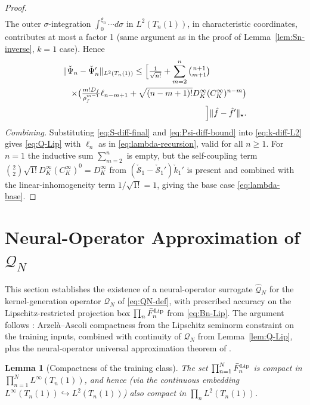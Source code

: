 \documentclass[journal,twoside,web]{ieeecolor}
\newtheorem{lemma}{Lemma}
\begin{document}
\begin{proof}
\begin{eqnarray}
\end{eqnarray}
The outer $\sigma$-integration $\int_0^{\xi_n}\cdots d\sigma$ in $L^2(T_n(1))$, in characteristic coordinates, contributes at most a factor 1 (same argument as in the proof of Lemma~\ref{lem:Sn-inverse}, $k=1$ case). Hence
\begin{eqnarray}
\lefteqn{\|\check\Psi_n-\check\Psi_n'\|_{L^2(T_n(1))}\le\Big[\tfrac{1}{\sqrt{n!}}+\sum_{m=2}^n\tbinom{n+1}{m+1}} \nonumber\\
&& \times\big(\tfrac{m!D_f}{\rho_f^{m-1}}\ell_{n-m+1}+\sqrt{(n-m+1)!}D_K^\infty(C_K^\infty)^{n-m}\big) \nonumber\\
&& \Big]\|\hat f-\hat f'\|_\star. \label{eq:Psi-diff-bound}
\end{eqnarray}
\emph{Combining.} Substituting \eqref{eq:S-diff-final} and \eqref{eq:Psi-diff-bound} into \eqref{eq:k-diff-L2} gives \eqref{eq:Q-Lip} with $\ell_n$ as in \eqref{eq:lambda-recursion}, valid for all $n\ge 1$. For $n=1$ the inductive sum $\sum_{m=2}^n$ is empty, but the self-coupling term $\binom{2}{2}\sqrt{1!}D_K^\infty(C_K^\infty)^0=D_K^\infty$ from $(\check{\mathcal S}_1-\check{\mathcal S}_1')\check k_1'$ is present and combined with the linear-inhomogeneity term $1/\sqrt{1!}=1$, giving the base case \eqref{eq:lambda-base}.
\end{proof}

\section{Neural-Operator Approximation of $\mathcal Q_N$}\label{sec:NO-approx}

This section establishes the existence of a neural-operator surrogate $\widehat{\mathcal Q}_N$ for the kernel-generation operator $\mathcal Q_N$ of \eqref{eq:QN-def}, with prescribed accuracy on the Lipschitz-restricted projection box $\prod_n \bar F_n^{\rm Lip}$ from \eqref{eq:Bn-Lip}. The argument follows \cite[\S5]{HV3}: Arzel\`a--Ascoli compactness from the Lipschitz seminorm constraint on the training inputs, combined with continuity of $\mathcal Q_N$ from Lemma~\ref{lem:Q-Lip}, plus the neural-operator universal approximation theorem of \cite{Lu2021Universal}.

\begin{lemma}[Compactness of the training class]\label{lem:compactness}
The set $\prod_{n=1}^N \bar F_n^{\rm Lip}$ is compact in $\prod_{n=1}^N L^\infty(T_n(1))$, and hence (via the continuous embedding $L^\infty(T_n(1))\hookrightarrow L^2(T_n(1))$) also compact in $\prod_n L^2(T_n(1))$.
\end{lemma}
\end{document}
